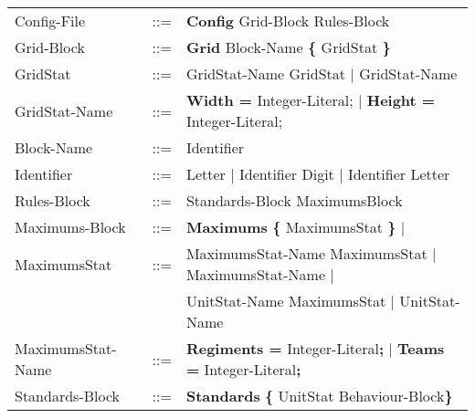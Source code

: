 \begin{center}
\begin{longtable}{ l l l }
				Config-File		   & 	::=  & {\bf Config} Grid-Block Rules-Block  		\\
				Grid-Block		   &	::=	 & {\bf Grid} Block-Name	 {\bf \{} GridStat \bf{\}} \\
				GridStat		   &	::=  & GridStat-Name GridStat $\mid$ GridStat-Name   \\
				GridStat-Name	   &	::=  & {\bf Width = } Integer-Literal; $\mid$ {\bf Height = } Integer-Literal; \\
				Block-Name		   &	::=  & Identifier							\\
				Identifier		   &    ::=  & Letter $\mid$ Identifier Digit $\mid$ Identifier Letter \\
				Rules-Block		   &	::=	 & Standards-Block MaximumsBlock 				\\
				Maximums-Block	   &	::=	 & {\bf Maximums} {\bf \{} MaximumsStat {\bf \}} $\mid$ \\
				MaximumsStat	   &	::=  & MaximumsStat-Name MaximumsStat $\mid$ MaximumsStat-Name $\mid$		\\
								   &	     & UnitStat-Name MaximumsStat $\mid$ UnitStat-Name			\\
				MaximumsStat-Name  &	::=  & {\bf Regiments = } Integer-Literal{\bf ;} $\mid$ {\bf Teams = } Integer-Literal{\bf ;} \\
				Standards-Block	   &    ::=  & {\bf Standards} {\bf \{ } UnitStat Behaviour-Block\bf{\} }		\\
				\end{longtable}
		\end{center}
		
